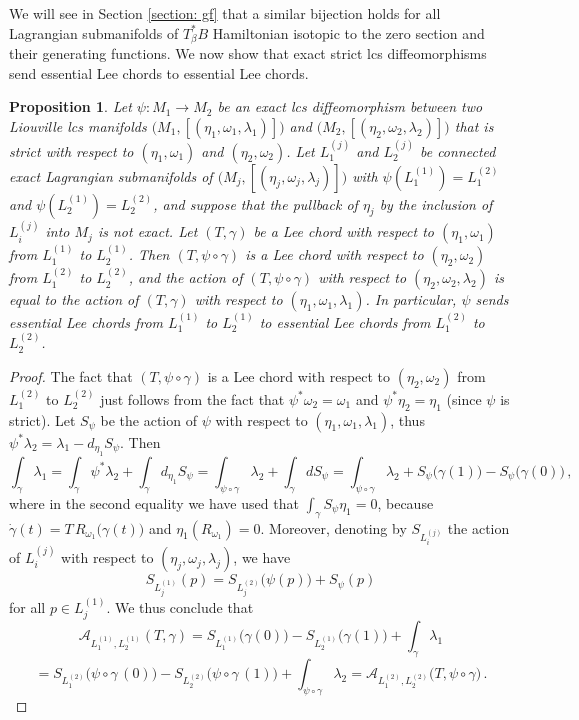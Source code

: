 \documentclass{amsart}
\newtheorem{prop}[thm]{Proposition}
\theoremstyle{remark}
\begin{document}
We will see in Section \ref{section: gf}
that a similar bijection holds
for all Lagrangian submanifolds of $T_{\beta}^{\ast}B$
Hamiltonian isotopic to the zero section
and their generating functions.
We now show that exact strict lcs diffeomorphisms
send essential Lee chords to essential Lee chords.

\begin{prop}\label{proposition: action invariant by strict exact}
Let $\psi: M_1 \rightarrow M_2$ be an exact lcs diffeomorphism
between two Liouville lcs manifolds
$\big( M_1, [(\eta_1, \omega_1, \lambda_1)] \big)$
and $\big( M_2, [(\eta_2, \omega_2, \lambda_2)] \big)$
that is strict with respect to
$(\eta_1, \omega_1)$ and $(\eta_2, \omega_2)$.
Let $L_1^{(j)}$ and $L_2^{(j)}$
be connected exact Lagrangian submanifolds
of $\big( M_j, [(\eta_j, \omega_j, \lambda_j)] \big)$
with $\psi (L_1^{(1)}) = L_1^{(2)}$ and $\psi (L_2^{(1)}) = L_2^{(2)}$,
and suppose that the pullback of $\eta_j$
by the inclusion of $L_i^{(j)}$ into $M_j$ is not exact.
Let $(T, \gamma)$ be a Lee chord with respect to $(\eta_1, \omega_1)$
from $L_1^{(1)}$ to $L_2^{(1)}$.
Then $( T, \psi \circ \gamma )$ is a Lee chord
with respect to $(\eta_2, \omega_2)$
from $L_1^{(2)}$ to $L_2^{(2)}$,
and the action of $( T, \psi \circ \gamma )$
with respect to $(\eta_2, \omega_2, \lambda_2)$
is equal to the action of $(T, \gamma)$
with respect to $(\eta_1, \omega_1, \lambda_1)$.
In particular,
$\psi$ sends essential Lee chords from $L_1^{(1)}$ to $L_2^{(1)}$
to essential Lee chords from $L_1^{(2)}$ to $L_2^{(2)}$.
\end{prop}

\begin{proof}
The fact that $( T, \psi \circ \gamma )$ is a Lee chord
with respect to $(\eta_2, \omega_2)$
from $L_1^{(2)}$ to $L_2^{(2)}$
just follows from the fact that $\psi^{\ast}\omega_2 = \omega_1$
and $\psi^{\ast}\eta_2 = \eta_1$
(since $\psi$ is strict).
Let $S_{\psi}$ be the action of $\psi$
with respect to $(\eta_1, \omega_1, \lambda_1)$,
thus $\psi^{\ast}\lambda_2 = \lambda_1 - d_{\eta_1} S_{\psi}$.
Then
\[
\int_{\gamma} \lambda_1
= \int_{\gamma} \psi^{\ast}\lambda_2 + \int_{\gamma} d_{\eta_1}S_{\psi}
= \int_{\psi \circ \gamma} \lambda_2 + \int_{\gamma} dS_{\psi}
= \int_{\psi \circ \gamma} \lambda_2 + S_{\psi} \big(\gamma(1)\big) - S_{\psi} \big(\gamma(0)\big) \,,
\]
where in the second equality
we have used that $\int_{\gamma} S_{\psi} \eta_1 = 0$,
because $\dot{\gamma} (t) = T \, R_{\omega_1} \big(\gamma(t)\big)$
and $\eta_1 (R_{\omega_1}) = 0$.
Moreover,
denoting by $S_{L_i^{(j)}}$ the action of $L_i^{(j)}$
with respect to $(\eta_j, \omega_j, \lambda_j)$,
we have
\[
S_{L_j^{(1)}} (p) = S_{L_j^{(2)}} \big(\psi(p)\big) + S_{\psi} (p)
\]
for all $p \in L_j^{(1)}$.
We thus conclude that
\[
\mathcal{A}_{L_1^{(1)}, L_2^{(1)}} (T, \gamma)
= S_{L_1^{(1)}} \big(\gamma(0)\big) - S_{L_2^{(1)}} \big(\gamma(1)\big) + \int_{\gamma}\lambda_1
\]
\[
= S_{L_1^{(2)}} \big( \psi \circ \gamma \, (0) \big)
- S_{L_2^{(2)}} \big( \psi \circ \gamma \, (1) \big)
+ \int_{\psi \circ \gamma}\lambda_2
= \mathcal{A}_{L_1^{(2)}, L_2^{(2)}} \big( T, \psi \circ \gamma\big) \,.
\]
\end{proof}
\end{document}
